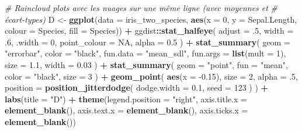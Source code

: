 \documentclass[
  french,
]{book}
\newenvironment{Shaded}{\begin{snugshade}}{\end{snugshade}}
\newcommand{\CommentTok}[1]{\textcolor[rgb]{0.56,0.35,0.01}{\textit{#1}}}
\newcommand{\DataTypeTok}[1]{\textcolor[rgb]{0.13,0.29,0.53}{#1}}
\newcommand{\DecValTok}[1]{\textcolor[rgb]{0.00,0.00,0.81}{#1}}
\newcommand{\FloatTok}[1]{\textcolor[rgb]{0.00,0.00,0.81}{#1}}
\newcommand{\KeywordTok}[1]{\textcolor[rgb]{0.13,0.29,0.53}{\textbf{#1}}}
\newcommand{\NormalTok}[1]{#1}
\newcommand{\OperatorTok}[1]{\textcolor[rgb]{0.81,0.36,0.00}{\textbf{#1}}}
\newcommand{\OtherTok}[1]{\textcolor[rgb]{0.56,0.35,0.01}{#1}}
\newcommand{\StringTok}[1]{\textcolor[rgb]{0.31,0.60,0.02}{#1}}
\begin{document}
\begin{Shaded}
\begin{Highlighting}[]
\CommentTok{# Raincloud plots avec les nuages sur une même ligne (avec moyennes et }
\CommentTok{# écart-types)}
\NormalTok{D <-}
\StringTok{  }\KeywordTok{ggplot}\NormalTok{(}\DataTypeTok{data =}\NormalTok{ iris_two_species, }
         \KeywordTok{aes}\NormalTok{(}\DataTypeTok{x =} \DecValTok{0}\NormalTok{, }\DataTypeTok{y =}\NormalTok{ Sepal.Length, }\DataTypeTok{colour =}\NormalTok{ Species, }\DataTypeTok{fill =}\NormalTok{ Species)) }\OperatorTok{+}
\StringTok{  }\NormalTok{ggdist}\OperatorTok{::}\KeywordTok{stat_halfeye}\NormalTok{(}
    \DataTypeTok{adjust =} \FloatTok{.5}\NormalTok{, }
    \DataTypeTok{width =} \FloatTok{.6}\NormalTok{, }
    \DataTypeTok{.width =} \DecValTok{0}\NormalTok{, }
    \DataTypeTok{point_colour =} \OtherTok{NA}\NormalTok{,}
    \DataTypeTok{alpha =} \FloatTok{0.5}
\NormalTok{    ) }\OperatorTok{+}
\StringTok{  }\KeywordTok{stat_summary}\NormalTok{(}
    \DataTypeTok{geom =} \StringTok{"errorbar"}\NormalTok{,}
    \DataTypeTok{color =} \StringTok{"black"}\NormalTok{,}
    \DataTypeTok{fun.data =} \StringTok{"mean_sdl"}\NormalTok{,}
    \DataTypeTok{fun.args =} \KeywordTok{list}\NormalTok{(}\DataTypeTok{mult =} \DecValTok{1}\NormalTok{),}
    \DataTypeTok{size =} \FloatTok{1.1}\NormalTok{, }
    \DataTypeTok{width =} \FloatTok{0.03}
\NormalTok{    ) }\OperatorTok{+}\StringTok{ }
\StringTok{  }\KeywordTok{stat_summary}\NormalTok{(}
    \DataTypeTok{geom =} \StringTok{"point"}\NormalTok{,}
    \DataTypeTok{fun =} \StringTok{"mean"}\NormalTok{, }
    \DataTypeTok{color =} \StringTok{"black"}\NormalTok{,}
    \DataTypeTok{size =} \DecValTok{3}
\NormalTok{    ) }\OperatorTok{+}
\StringTok{  }\KeywordTok{geom_point}\NormalTok{(}
    \KeywordTok{aes}\NormalTok{(}\DataTypeTok{x =} \FloatTok{-0.15}\NormalTok{),}
    \DataTypeTok{size =} \DecValTok{2}\NormalTok{, }
    \DataTypeTok{alpha =} \FloatTok{.5}\NormalTok{,}
    \DataTypeTok{position =} \KeywordTok{position_jitterdodge}\NormalTok{(}
                          \DataTypeTok{dodge.width =} \FloatTok{0.1}\NormalTok{,}
                          \DataTypeTok{seed =} \DecValTok{123}
\NormalTok{                    )}
\NormalTok{  ) }\OperatorTok{+}
\StringTok{  }\KeywordTok{labs}\NormalTok{(}\DataTypeTok{title =} \StringTok{"D"}\NormalTok{) }\OperatorTok{+}
\StringTok{  }\KeywordTok{theme}\NormalTok{(}\DataTypeTok{legend.position =} \StringTok{"right"}\NormalTok{,}
        \DataTypeTok{axis.title.x =} \KeywordTok{element_blank}\NormalTok{(),}
        \DataTypeTok{axis.text.x =} \KeywordTok{element_blank}\NormalTok{(),}
        \DataTypeTok{axis.ticks.x =} \KeywordTok{element_blank}\NormalTok{())}
\end{Highlighting}
\end{Shaded}
\end{document}
